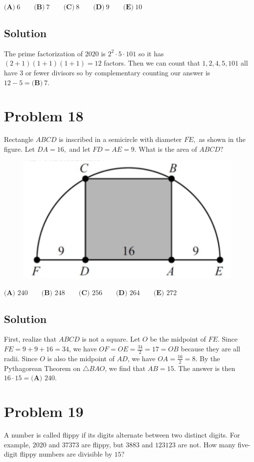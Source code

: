 \documentclass{article}
\begin{document}
$\textbf{(A)}\ 6 \qquad \textbf{(B)}\ 7 \qquad \textbf{(C)}\ 8 \qquad \textbf{(D)}\ 9 \qquad \textbf{(E)}\ 10$
\subsection{Solution}
The prime factorization of $2020$ is $2^2\cdot5\cdot101$ so it has $(2+1)(1+1)(1+1)=12$ factors. Then we can count that $1,2,4,5,101$ all have $3$ or fewer divisors so by complementary counting our answer is $12-5=\textbf{(B)}\ 7$.
\section{Problem 18}
Rectangle $ABCD$ is inscribed in a semicircle with diameter $\overline{FE},$ as shown in the figure. Let $DA=16,$ and let $FD=AE=9.$ What is the area of $ABCD?$

\begin{figure}[ht]
\centering
\includegraphics[width=.5\textwidth]{2020 AMC 8 Problem 18.png}
\end{figure}

$\textbf{(A) }240 \qquad \textbf{(B) }248 \qquad \textbf{(C) }256 \qquad \textbf{(D) }264 \qquad \textbf{(E) }272$
\subsection{Solution}
First, realize that $ABCD$ is not a square. Let $O$ be the midpoint of $FE$. Since $FE=9+9+16=34$, we have $OF=OE=\frac{34}{2}=17=OB$ because they are all radii. Since $O$ is also the midpoint of $AD$, we have $OA=\frac{16}2=8$. By the Pythagorean Theorem on $\triangle BAO$, we find that $AB=15$. The answer is then $16\cdot 15=\textbf{(A) }240$.
\section{Problem 19}
A number is called flippy if its digits alternate between two distinct digits. For example, $2020$ and $37373$ are flippy, but $3883$ and $123123$ are not. How many five-digit flippy numbers are divisible by $15?$
\end{document}
